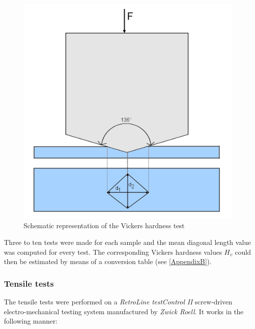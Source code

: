 \begin{figure}[ht]
\centering
\centerline{\includegraphics[scale=0.29]{Images/Vickers}}
\decoRule
\caption[Schematic representation of the Vickers hardness test]{Schematic representation of the Vickers hardness test}
\label{fig:Vick}
\end{figure}

Three to ten tests were made for each sample and the mean diagonal length value was computed for every test. The corresponding Vickers hardness values $H_v$ could then be estimated by means of a conversion table (see \ref{AppendixB}).\\

\subsubsection{Tensile tests}
\label{MMTT}
The tensile tests were performed on a \textit{RetroLine testControl II} screw-driven electro-mechanical testing system manufactured by \textit{Zwick Roell}. It works in the following manner:

